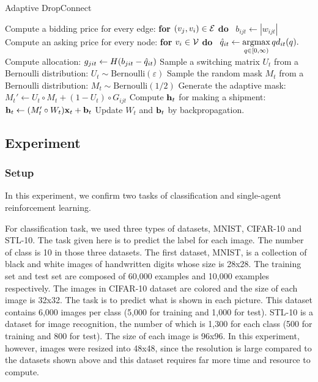\begin{algorithm}[t]
\caption{Adaptive DropConnect}
\begin{algorithmic}[1]
		\STATE Compute a bidding price for every edge: \textbf{for} $(v_j, v_i) \in \mathcal{E}$ \textbf{do} \
		$b_{ijt} \leftarrow |w_{ijt}|$ 
		\STATE Compute an asking price for every node: \textbf{for} $v_{i} \in \mathcal{V}$ \textbf{do} \
		${\hat{q}}_{it} \leftarrow \mathop{\rm argmax}\limits_{q \in [0, \infty)} q d_{it}(q).$
		\FOR{$(v_i, v_j) \in \edges$}
				\STATE Compute allocation: $g_{jit} \leftarrow H(b_{jit} - {\hat{q}}_{it})$ 
		\ENDFOR
		\STATE Sample a switching matrix $U_t$ from a Bernoulli distribution: $U_t \sim \mathrm{Bernoulli}(\varepsilon)$
		\STATE Sample the random mask $M_t$ from a Bernoulli distribution: $M_t \sim \mathrm{Bernoulli}(1/2)$
		\STATE Generate the adaptive mask: $M_t' \leftarrow U_t \circ M_t + (1 - U_t) \circ G_{ijt}$ 
		\STATE Compute $\mathrm{\mathbf{h}}_t$ for making a shipment:
			$\mathrm{\mathbf{h}}_t \leftarrow (M_t' \circ W_t) \mathrm{\mathbf{x}}_t + \mathrm{\mathbf{b}}_t$
		\STATE Update $W_t$ and $\mathrm{\mathbf{b}}_t$ by backpropagation.
	\ENDFOR
\end{algorithmic}
\end{algorithm}

\subsection{Experiment}

\subsubsection{Setup}
In this experiment, we confirm two tasks of classification and single-agent reinforcement learning.

For classification task, we used three types of datasets, MNIST, CIFAR-10 and STL-10. 
The task given here is to predict the label for each image. The number of class is 10 in those three datasets.
The first dataset, MNIST, is a collection of black and white images of handwritten digits whose size is 28x28. The training set and test set are composed of 60,000 examples and 10,000 examples respectively. 
The images in CIFAR-10 dataset are colored and the size of each image is 32x32. The task is to predict what is shown in each picture. This dataset contains 6,000 images per class (5,000 for training and 1,000 for test).
STL-10 is a dataset for image recognition, the number of which is 1,300 for each class (500 for training and 800 for test). The size of each image is 96x96. In this experiment, however, images were resized into 48x48, since the resolution is large compared to the datasets shown above and this dataset requires far more time and resource to compute.


